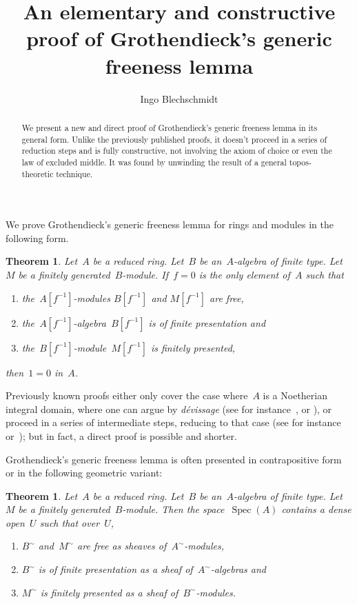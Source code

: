 \documentclass{amsart}
\title[Grothendieck's generic freeness lemma]{An elementary and constructive
proof of Grothendieck's generic freeness lemma}
\author{Ingo Blechschmidt}
\theoremstyle{definition}
\theoremstyle{plain}
\newtheorem{thm}[defn]{Theorem}
\theoremstyle{remark}
\DeclareMathOperator{\Spec}{Spec}
\newcommand{\stacksproject}[1]{\cite[{\href{https://stacks.math.columbia.edu/tag/#1}{Tag~#1}}]{stacks-project}}
\begin{document}
\begin{abstract}
  We present a new and direct proof of Grothendieck's generic freeness
  lemma in its general form. Unlike the previously published proofs, it doesn't
  proceed in a series of reduction steps and is fully constructive, not
  involving the axiom of choice or even the law of excluded middle. It was
  found by unwinding the result of a general topos-theoretic technique.
\end{abstract}

\maketitle

\noindent
We prove Grothendieck's generic freeness lemma for rings and modules in the
following form.

\begin{thm}\label{thm:algebraic}Let~$A$ be a reduced ring. Let~$B$ be
an~$A$-algebra of finite type. Let~$M$ be a finitely generated~$B$-module.
If~$f = 0$ is the only element of~$A$ such that
\begin{enumerate}
\item the~$A[f^{-1}]$-modules $B[f^{-1}]$ and $M[f^{-1}]$ are free,
\item the~$A[f^{-1}]$-algebra~$B[f^{-1}]$ is of finite presentation and
\item the~$B[f^{-1}]$-module~$M[f^{-1}]$ is finitely presented,
\end{enumerate}
then~$1 = 0$ in~$A$.
\end{thm}

Previously known proofs either only cover the case where~$A$ is a Noetherian
integral domain, where one can argue by \emph{dévissage} (see for
instance~\cite[Lemme~6.9.2]{ega-4-2},
\cite[Thm.~24.1]{matsumura:commutative-ring-theory} or
\cite[Thm.~14.4]{eisenbud:commutative-algebra}), or proceed in a series of
intermediate steps, reducing to that case (see for
instance~\cite{staats:generic-freeness} or~\stacksproject{051Q}); but in fact,
a direct proof is possible and shorter.

Grothendieck's generic freeness lemma is often presented in contrapositive form
or in the following geometric variant:

\begin{thm}\label{thm:geometric}Let~$A$ be a reduced ring. Let~$B$ be
an~$A$-algebra of finite type. Let~$M$ be a finitely generated~$B$-module. Then
the space~$\Spec(A)$ contains a dense open~$U$ such that over~$U$,
\begin{enumerate}
\item[(a)] $B^\sim$ and~$M^\sim$ are free as sheaves of~$A^\sim$-modules,
\item[(b)] $B^\sim$ is of finite presentation as a sheaf of~$A^\sim$-algebras and
\item[(c)] $M^\sim$ is finitely presented as a sheaf of~$B^\sim$-modules.
\end{enumerate}
\end{thm}
\end{document}
